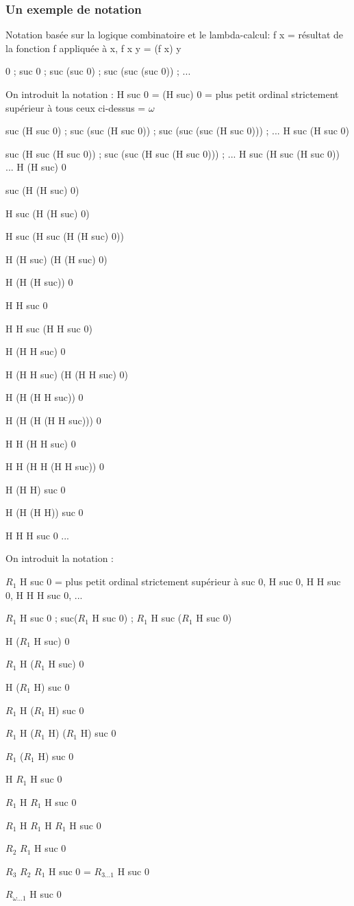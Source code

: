 \documentclass[12pt]{beamer}
\begin{document}
\begin{frame}
\frametitle{Un exemple de notation}

\small 
Notation basée sur la logique combinatoire et le lambda-calcul: f x = résultat de la fonction f appliquée à x, f x y = (f x) y

\small

0 ; suc 0 ; suc (suc 0) ; suc (suc (suc 0)) ; ...

On introduit la notation : H suc 0 = (H suc) 0 = plus petit ordinal strictement supérieur à tous ceux ci-dessus = $\omega$

suc (H suc 0) ; suc (suc (H suc 0)) ; suc (suc (suc (H suc 0))) ; ... H suc (H suc 0)

suc (H suc (H suc 0)) ; suc (suc (H suc (H suc 0))) ; ... H suc (H suc (H suc 0)) ... H (H suc) 0

suc (H (H suc) 0) 

H suc (H (H suc) 0) 

H suc (H suc (H (H suc) 0)) 

H (H suc) (H (H suc) 0) 

H (H (H suc)) 0 

H H suc 0 

\end{frame}
\begin{frame}

H H suc (H H suc 0) 

H (H H suc) 0 

H (H H suc) (H (H H suc) 0) 

H (H (H H suc)) 0 

H (H (H (H H suc))) 0 

H H (H H suc) 0 

H H (H H (H H suc)) 0 

H (H H) suc 0 

H (H (H H)) suc 0 

H H H suc 0 ...

On introduit la notation : 

$R_1$ H suc 0 = plus petit ordinal strictement supérieur à suc 0, H suc 0, H H suc 0, H H H suc 0, ...

\end{frame}
\begin{frame}

$R_1$ H suc 0 ; suc($R_1$ H suc 0) ; $R_1$ H suc ($R_1$ H suc 0) 

H ($R_1$ H suc) 0 

$R_1$ H ($R_1$ H suc) 0 

 H ($R_1$ H) suc 0 

$R_1$ H ($R_1$ H) suc 0 

$R_1$ H ($R_1$ H) ($R_1$ H) suc 0 

$R_1$ ($R_1$ H) suc 0 

 H $R_1$ H suc 0 

$R_1$ H $R_1$ H suc 0 

$R_1$ H $R_1$ H $R_1$ H suc 0

$R_2$ $R_1$ H suc 0 

$R_3$ $R_2$ $R_1$ H suc 0 = $R_{3 \ldots 1}$ H suc 0 

$R_{\omega \ldots 1}$ H suc 0

\end{frame}
\end{document}
